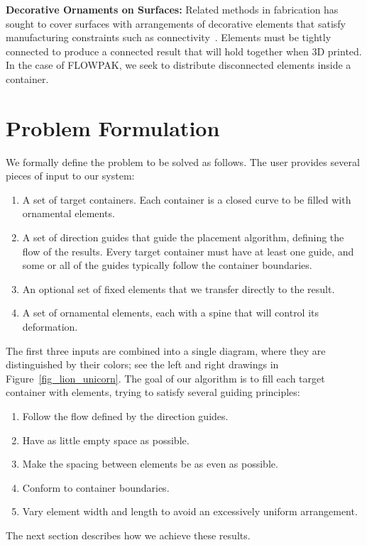 \newtext
{
\textbf{Decorative Ornaments on Surfaces:} 
Related methods in fabrication has sought to cover surfaces with
arrangements of decorative elements that satisfy manufacturing
constraints such as connectivity~\cite{Chen2016, Zehnder2016, Bian2018, Martinez2019}.
Elements must be tightly connected to produce a connected result
that will hold together when 3D printed.
In the case of FLOWPAK, we seek to distribute disconnected elements inside a container.
}


\section{Problem Formulation}
\label{flowpak_problem_formulation}

We formally define the problem to be solved as follows.  The user provides several pieces of input
to our system:
\begin{enumerate}
      \item A set of target containers.
            Each container 
			is a closed curve to be filled with ornamental elements.
      \item A set of direction guides
      		that guide the placement algorithm, defining the flow of the results. 
      		Every target container must have at least one guide, and some or
      		all of the guides typically follow the container boundaries.
      \item An optional set of fixed elements that we transfer directly to the result.
      \item A set of ornamental elements, each with a spine that will control
            its deformation.
\end{enumerate}

The first three inputs are combined into a single diagram, where they are
distinguished by their colors; see
the left and right drawings in Figure~\ref{fig_lion_unicorn}.
The goal of our algorithm is to fill each target container with elements,
trying to satisfy several guiding principles:

\begin{enumerate}
	\item Follow the flow defined by the direction guides.
	\item Have as little empty space as possible.
	\item Make the spacing between elements be as even as possible.
	\item Conform to container boundaries.
	\item Vary element width and length to avoid an excessively uniform arrangement.
\end{enumerate}
The next section describes how we achieve these results.

